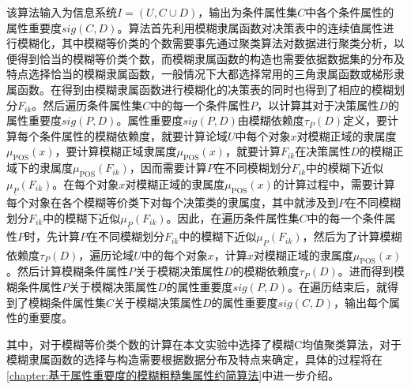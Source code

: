 该算法输入为信息系统$I=(U,C\cup D)$，输出为条件属性集$C$中各个条件属性的属性重要度$sig(C,D)$。算法首先利用模糊隶属函数对决策表中的连续值属性进行模糊化，其中模糊等价类的个数需要事先通过聚类算法对数据进行聚类分析，以便得到恰当的模糊等价类个数，而模糊隶属函数的构造也需要依据数据集的分布及特点选择恰当的模糊隶属函数，一般情况下大都选择常用的三角隶属函数或梯形隶属函数。在得到由模糊隶属函数进行模糊化的决策表的同时也得到了相应的模糊划分$F_{ik}$。然后遍历条件属性集$C$中的每一个条件属性$P$，以计算其对于决策属性$D$的属性重要度$sig(P,D)$。属性重要度$sig(P,D)$由模糊依赖度$\tau_{P}(D)$定义，要计算每个条件属性的模糊依赖度，就要计算论域$U$中每个对象$x$对模糊正域的隶属度$\mu_{\operatorname{POS}}(x)$，要计算模糊正域隶属度$\mu_{\operatorname{POS}}(x)$，就要计算$F_{ik}$在决策属性$D$的模糊正域下的隶属度$\mu_{\operatorname{POS}}(F_{i k})$，因而需要计算$P$在不同模糊划分$F_{ik}$中的模糊下近似$\mu_{\underline{P}}(F_{ik})$。在每个对象$x$对模糊正域的隶属度$\mu_{\operatorname{POS}}(x)$的计算过程中，需要计算每个对象在各个模糊等价类下对每个决策类的隶属度，其中就涉及到$P$在不同模糊划分$F_{ik}$中的模糊下近似$\mu_{\underline{P}}(F_{ik})$。因此，在遍历条件属性集$C$中的每一个条件属性$P$时，先计算$P$在不同模糊划分$F_{ik}$中的模糊下近似$\mu_{\underline{P}}(F_{ik})$，然后为了计算模糊依赖度$\tau_{P}(D)$，遍历论域$U$中的每个对象$x$，计算$x$对模糊正域的隶属度$\mu_{\operatorname{POS}}(x)$。然后计算模糊条件属性$P$关于模糊决策属性$D$的模糊依赖度$\tau_{P}(D)$。进而得到模糊条件属性$P$关于模糊决策属性$D$的属性重要度$sig(P,D)$。在遍历结束后，就得到了模糊条件属性集$C$关于模糊决策属性$D$的属性重要度$sig(C,D)$，输出每个属性的重要度。


其中，对于模糊等价类个数的计算在本文实验中选择了模糊C均值聚类算法，对于模糊隶属函数的选择与构造需要根据数据分布及特点来确定，具体的过程将在\ref{chapter:基于属性重要度的模糊粗糙集属性约简算法}中进一步介绍。










  
